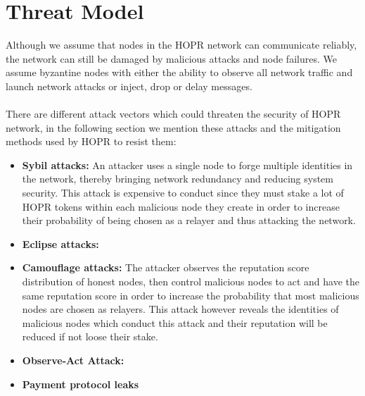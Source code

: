 \section{Threat Model}
Although we assume that nodes in the HOPR network can communicate reliably, the network can still be damaged by malicious attacks and node failures. We assume byzantine nodes with either the ability to observe all network traffic and launch network attacks or inject, drop or delay messages. 
\\~\\There are different attack vectors which could threaten the security of HOPR network, in the following section we mention these attacks and the mitigation methods used by HOPR to resist them:
\begin{itemize}
    \item \textbf{Sybil attacks:} An attacker uses a single node to forge multiple identities in the network, thereby bringing network redundancy and reducing system security. This attack is expensive to conduct since they must stake a lot of HOPR tokens within each malicious node they create in order to increase their probability of being chosen as a relayer and thus attacking the network. 
   \item \textbf{Eclipse attacks:}
   \item \textbf{Camouflage attacks:} The attacker observes the reputation score distribution of honest nodes, then control malicious nodes to act and have the same reputation score in order to increase the probability that most malicious nodes are chosen as relayers.
   This attack however reveals the identities of malicious nodes which conduct this attack and their reputation will be reduced if not loose their stake.
   \item \textbf{Observe-Act Attack:}
   \item \textbf{Payment protocol leaks}
   
   
   
\end{itemize}